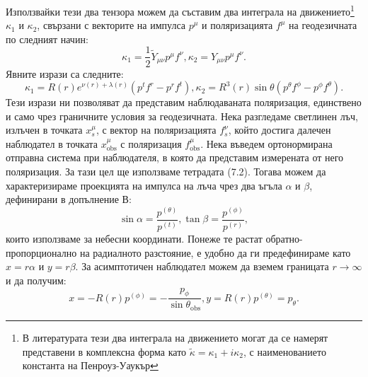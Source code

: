 Използвайки тези два тензора можем да съставим два интеграла на движението\footnote{В литературата тези два интеграла на движението могат да се намерят представени в комплексна форма като $\tilde{\kappa} = \kappa_1 + i\kappa_2$, с наименованието константа на Пенроуз-Уаукър} $\kappa_1$ и $\kappa_2$, свързани с векторите на импулса $p^\mu$ и поляризацията $f^\mu$ на геодезичната по следният начин:
\begin{subequations}
	\begin{equation}
		\kappa_1 = \frac{1}{2}\tilde{Y}_{\mu\nu}p^\mu f^\nu,
	\end{equation}
	\begin{equation}
		\kappa_2 = Y_{\mu\nu}p^\mu f^\nu.
	\end{equation}
\end{subequations}
Явните изрази са следните:
\begin{subequations}
	\begin{equation}
		\kappa_1 = R(r)e^{\nu(r) + \lambda(r)}\left( p^tf^r - p^rf^t \right),
	\end{equation}
	\begin{equation}
		\kappa_2 = R^3(r)\sin\theta\left(p^\theta f^\phi - p^\phi f^\theta\right).
	\end{equation}
\end{subequations}
Тези изрази ни позволяват да представим наблюдаваната поляризация, единствено и само чрез граничните условия за геодезичната. Нека разгледаме светлинен лъч, излъчен в точката $x^\mu_s$, с вектор на поляризацията $f^\nu_s$, който достига далечен наблюдател в точката $x^\mu_{\text{obs}}$ с поляризация $f^\mu_{\text{obs}}$. Нека въведем ортонормирана отправна система при наблюдателя, в която да представим измерената от него поляризация. За тази цел ще използваме тетрадата (7.2). Тогава можем да характеризираме проекцията на импулса на лъча чрез два ъгъла $\alpha$ и $\beta$, дефинирани в допълнение В:
\begin{subequations}
	\begin{equation}
	\sin\alpha = \frac{p^{(\theta)}}{p^{(t)}},
	\end{equation}
	\begin{equation}
		\tan\beta = \frac{p^{(\phi)}}{p^{(r)}},
	\end{equation}
\end{subequations}
които използваме за небесни координати. Понеже те растат обратно-пропорционално на радиалното разстояние, е удобно да ги предефинираме като $x = r\alpha$ и $y = r\beta$. За асимптотичен наблюдател можем да вземем границата $r\rightarrow\infty$ и да получим:
\begin{subequations}
	\begin{equation}
		x = -R(r)p^{(\phi)} = -\frac{p_\phi}{\sin\theta_\text{obs}},
	\end{equation}
	\begin{equation}
		y = R(r)p^{(\theta)} = p_\theta.
	\end{equation}
\end{subequations}

